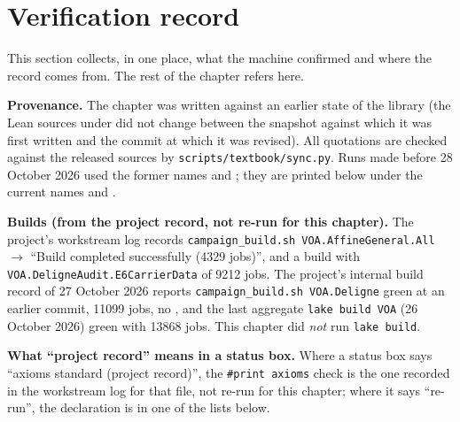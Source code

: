 \section{Verification record}\label{l23:sec:verification}

This section collects, in one place, what the machine confirmed and where the record comes from. The rest of the chapter refers here.

\textbf{Provenance.} The chapter was written against an earlier state of the library (the Lean sources under  did not
change between the snapshot against which it was first written and the commit at which it was revised). All quotations are checked
against the released sources by \texttt{scripts/textbook/sync.py}. Runs made before 28 October 2026 used the former names
 and ; they are printed below under the current names
 and .

\textbf{Builds (from the project record, not re-run for this chapter).} The project's workstream log
 records \texttt{campaign\_build.sh VOA.AffineGeneral.All}
$\to$ ``Build completed successfully (4329 jobs)'', and a build with \texttt{VOA.DeligneAudit.E6CarrierData} of 9212 jobs. The project's
internal build record of 27 October 2026 reports \texttt{campaign\_build.sh VOA.Deligne} green at an earlier commit, 11099 jobs, no
, and the last aggregate \texttt{lake build VOA} (26 October 2026) green with 13868 jobs. This chapter did \emph{not} run
\texttt{lake build}.

\textbf{What ``project record'' means in a status box.} Where a status box says ``axioms standard (project record)'', the
\texttt{\#print axioms} check is the one recorded in the workstream log for that file, not re-run for this chapter; where it says
``re-run'', the declaration is in one of the lists below.

